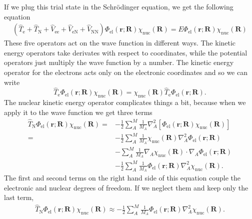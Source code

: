 \documentclass[../Main/chem532-notes.tex]{subfiles}
\begin{document}
If we plug this trial state in the Schr\"{o}dinger equation, we get the following equation
\begin{equation}
\label{eq:schrodinger_equation_factorized_ansatz}
\begin{split}
(\hat{T}_\mathrm{e} + \hat{T}_\mathrm{N} + \hat{V}_\mathrm{ee} + \hat{V}_\mathrm{eN} +\hat{V}_\mathrm{NN}) \Phi_{\mathrm{el}}(\mathbf{r};\mathbf{R}) \chi_{\mathrm{nuc}}(\mathbf{R})
= E \Phi_{\mathrm{el}}(\mathbf{r};\mathbf{R}) \chi_{\mathrm{nuc}}(\mathbf{R})
\end{split}
\end{equation}
These five operators act on the wave function in different ways.
The kinetic energy operators take derivates with respect to coordinates, while the potential operators just multiply the wave function by a number.
The kinetic energy operator for the electrons acts only on the electronic coordinates and so we can write
\begin{equation}
\hat{T}_\mathrm{e} \Phi_{\mathrm{el}}(\mathbf{r};\mathbf{R}) \chi_{\mathrm{nuc}}(\mathbf{R})
= \chi_{\mathrm{nuc}}(\mathbf{R}) \hat{T}_\mathrm{e} \Phi_{\mathrm{el}}(\mathbf{r};\mathbf{R}).
\end{equation}
The nuclear kinetic energy operator complicates things a bit, because when we apply it to the wave function we get three terms
\begin{equation}
\begin{split}
\hat{T}_\mathrm{N}  \Phi_{\mathrm{el}}(\mathbf{r};\mathbf{R}) \chi_{\mathrm{nuc}}(\mathbf{R})
 = &  -\frac{1}{2} \sum_A^M \frac{1}{M_A} \nabla^2_A \left[  \Phi_{\mathrm{el}}(\mathbf{r};\mathbf{R}) \chi_{\mathrm{nuc}}(\mathbf{R}) \right] \\
= &  -\frac{1}{2} \sum_A^M \frac{1}{M_A}
\chi_{\mathrm{nuc}}(\mathbf{R})  \nabla^2_A  
\Phi_{\mathrm{el}}(\mathbf{r};\mathbf{R}) \\
& 
 - \sum_A^M \frac{1}{M_A}
 \nabla_A\chi_{\mathrm{nuc}}(\mathbf{R})  \cdot \nabla_A  
\Phi_{\mathrm{el}}(\mathbf{r};\mathbf{R}) \\
& 
 -\frac{1}{2} \sum_A^M \frac{1}{M_A}
 \Phi_{\mathrm{el}}(\mathbf{r};\mathbf{R})  \nabla^2_A \chi_{\mathrm{nuc}}(\mathbf{R}).
\end{split}
\end{equation}
The first and second terms on the right hand side of this equation couple the electronic and nuclear degrees of freedom.
If we neglect them and keep only the last term,
\begin{equation}
\begin{split}
\hat{T}_\mathrm{N}  \Phi_{\mathrm{el}}(\mathbf{r};\mathbf{R}) \chi_{\mathrm{nuc}}(\mathbf{R})
\approx 
 -\frac{1}{2} \sum_A^M \frac{1}{M_A}
 \Phi_{\mathrm{el}}(\mathbf{r};\mathbf{R})  \nabla^2_A \chi_{\mathrm{nuc}}(\mathbf{R}).
\end{split}
\end{equation}
\end{document}
